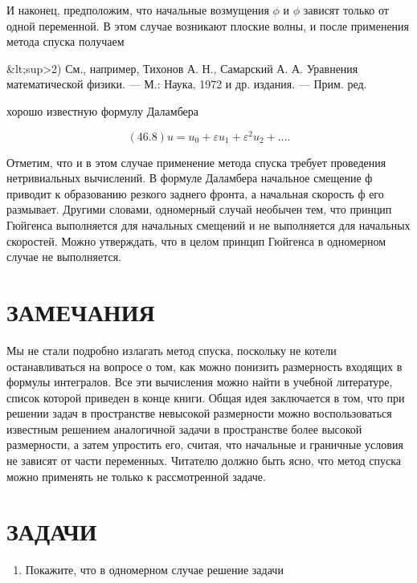 \documentclass[
  ukrainian,
]{article}
\providecommand{\tightlist}{%
  \setlength{\itemsep}{0pt}\setlength{\parskip}{0pt}}
\begin{document}
И наконец, предположим, что начальные возмущения \(\phi\) и \(\phi\)
зависят только от одной переменной. В этом случае возникают плоские
волны, и после применения метода спуска получаем

\&lt;sup\textgreater2) См., например, Тихонов А. Н., Самарский А. А.
Уравнения математической физики. --- М.: Наука, 1972 и др. издания. ---
Прим. ред.

хорошо известную формулу Даламбера

\[
(46.8) u = u_0 + \varepsilon u_1 + \varepsilon^2 u_2 + \dots.
\]

Отметим, что и в этом случае применение метода спуска требует проведения
нетривиальных вычислений. В формуле Даламбера начальное смещение ф
приводит к образованию резкого заднего фронта, а начальная скорость ф
его размывает. Другими словами, одномерный случай необычен тем, что
принцип Гюйгенса выполняется для начальных смещений и не выполняется для
начальных скоростей. Можно утверждать, что в целом принцип Гюйгенса в
одномерном случае не выполняется.

\section{ЗАМЕЧАНИЯ}\label{ux437ux430ux43cux435ux447ux430ux43dux438ux44f-10}

Мы не стали подробно излагать метод спуска, поскольку не котели
останавливаться на вопросе о том, как можно понизить размерность
входящих в формулы интегралов. Все эти вычисления можно найти в учебной
литературе, список которой приведен в конце книги. Общая идея
заключается в том, что при решении задач в пространстве невысокой
размерности можно воспользоваться известным решением аналогичной задачи
в пространстве более высокой размерности, а затем упростить его, считая,
что начальные и граничные условия не зависят от части переменных.
Читателю должно быть ясно, что метод спуска можно применять не только к
рассмотренной задаче.

\section{ЗАДАЧИ}\label{ux437ux430ux434ux430ux447ux438-10}

\begin{enumerate}
\def\labelenumi{\arabic{enumi}.}
\tightlist
\item
  Покажите, что в одномерном случае решение задачи
\end{enumerate}
\end{document}
